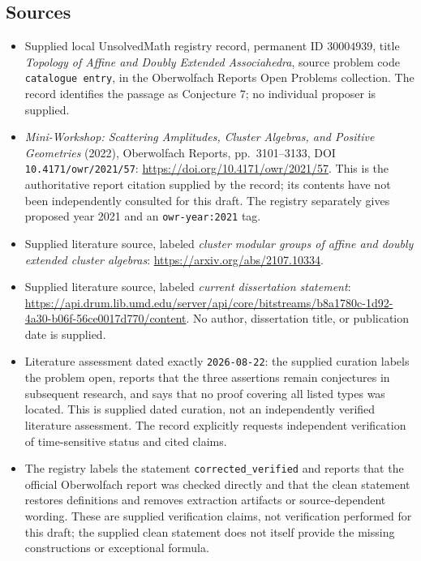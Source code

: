 \documentclass[11pt]{article}
\begin{document}
\subsection{Sources}
\begin{itemize}
\item Supplied local UnsolvedMath registry record, permanent ID \(30004939\), title \emph{Topology of Affine and Doubly Extended Associahedra}, source problem code \texttt{catalogue entry}, in the Oberwolfach Reports Open Problems collection. The record identifies the passage as Conjecture 7; no individual proposer is supplied.
\item \emph{Mini-Workshop: Scattering Amplitudes, Cluster Algebras, and Positive Geometries} (2022), Oberwolfach Reports, pp.\ 3101--3133, DOI \texttt{10.4171/owr/2021/57}: \url{https://doi.org/10.4171/owr/2021/57}. This is the authoritative report citation supplied by the record; its contents have not been independently consulted for this draft. The registry separately gives proposed year 2021 and an \texttt{owr-year:2021} tag.
\item Supplied literature source, labeled \emph{cluster modular groups of affine and doubly extended cluster algebras}: \url{https://arxiv.org/abs/2107.10334}.
\item Supplied literature source, labeled \emph{current dissertation statement}: \url{https://api.drum.lib.umd.edu/server/api/core/bitstreams/b8a1780c-1d92-4a30-b06f-56ce0017d770/content}. No author, dissertation title, or publication date is supplied.
\item Literature assessment dated exactly \texttt{2026-08-22}: the supplied curation labels the problem open, reports that the three assertions remain conjectures in subsequent research, and says that no proof covering all listed types was located. This is supplied dated curation, not an independently verified literature assessment. The record explicitly requests independent verification of time-sensitive status and cited claims.
\item The registry labels the statement \texttt{corrected\_verified} and reports that the official Oberwolfach report was checked directly and that the clean statement restores definitions and removes extraction artifacts or source-dependent wording. These are supplied verification claims, not verification performed for this draft; the supplied clean statement does not itself provide the missing constructions or exceptional formula.
\end{itemize}
\end{document}
